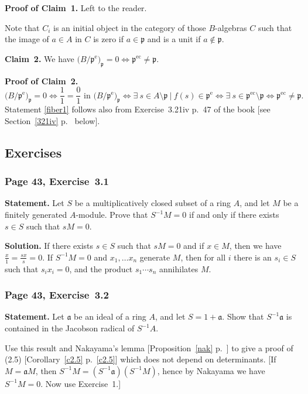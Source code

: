 \documentclass[12pt,letterpaper]{article}%
\newcommand{\oo}{\operatorname}\newcommand{\ooo}{\operatorname*}
\newcommand{\mf}{\mathfrak}
\newcommand{\aaa}{\mf a}
\newcommand{\ppp}{\mf p}
\newcommand{\nn}{\noindent}
\begin{document}
\nn\textbf{Proof of Claim~1.} Left to the reader. 

Note that $C_i$ is an initial object in the category of those $B$-algebras $C$ such that the image of $a\in A$ in $C$ is zero if $a\in\ppp$ and is a unit if $a\notin\ppp$. 

\nn\textbf{Claim~2.} We have $\big(B/\ppp^{\oo e}\big)_\ppp=0\iff\ppp^{\oo{ec}}\ne\ppp$. 

\nn\textbf{Proof of Claim~2.} 
$$
\big(B/\ppp^{\oo e}\big)_\ppp=0\iff\frac11=\frac01\text{ in }\big(B/\ppp^{\oo e}\big)_\ppp\iff\exists\ s\in A\setminus\ppp\ |\ f(s)\in\ppp^{\oo e}\iff\exists\ s\in\ppp^{\oo{ec}}\setminus\ppp\iff\ppp^{\oo{ec}}\ne\ppp.
$$ 
Statement \eqref{fiber1} follows also from Exercise~3.21iv p.~47 of the book [see Section~\ref{321iv} p.~\pageref{321iv} below]. 


\subsection{Exercises}%

\subsubsection{Page 43, Exercise~3.1}%

\textbf{Statement.} Let $S$ be a multiplicatively closed subset of a ring $A$, and let $M$ be a finitely generated $A$-module. Prove that $S^{-1}M=0$ if and only if there exists $s\in S$ such that $sM=0$.

\nn\textbf{Solution.} If there exists $s\in S$ such that $sM=0$ and if $x\in M$, then we have $\frac x1=\frac{sx}s=0$. If $S^{-1}M=0$ and $x_1,\ldots x_n$ generate $M$, then for all $i$ there is an $s_i\in S$ such that $s_ix_i=0$, and the product $s_1\cdots s_n$ annihilates $M$.

\subsubsection{Page 43, Exercise~3.2}%

\textbf{Statement.} Let $\aaa$ be an ideal of a ring $A$, and let $S=1+\aaa$. Show that $S^{-1}\aaa$ is contained in the Jacobson radical of $S^{-1}A$.

Use this result and Nakayama's lemma [Proposition~\ref{nak} p.~\pageref{nak}] to give a proof of (2.5) [Corollary~\ref{c2.5} p.~\ref{c2.5}] which does not depend on determinants. [If $M=\aaa M$, then $S^{-1}M=(S^{-1}\aaa)(S^{-1}M)$, hence by Nakayama we have $S^{-1}M=0$. Now use Exercise~1.]
\end{document}
